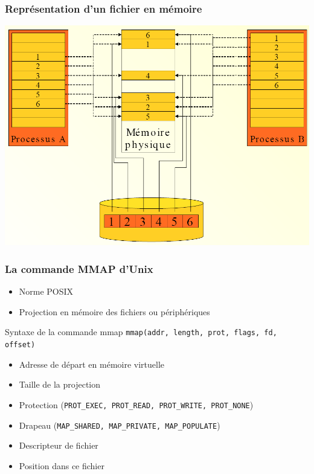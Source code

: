 \begin{frame}
\frametitle{Représentation d'un fichier en mémoire}
\includegraphics[width=.8\textwidth]{../illustration/repres_fichier_memoire.png}
\end{frame}

\begin{frame}
\frametitle{La commande MMAP d'Unix}
\begin{itemize}
  \item Norme POSIX
  \item Projection en mémoire des fichiers ou périphériques
\end{itemize}

\begin{exampleblock}{Syntaxe de la commande mmap}
    \texttt{mmap(addr, length, prot, flags, fd, offset)}

    \begin{itemize}
      \item Adresse de départ en mémoire virtuelle
      \item Taille de la projection
      \item Protection (\texttt{PROT\_EXEC, PROT\_READ, PROT\_WRITE, PROT\_NONE})
      \item Drapeau (\texttt{MAP\_SHARED, MAP\_PRIVATE, MAP\_POPULATE})
      \item Descripteur de fichier
      \item Position dans ce fichier
   \end{itemize}

\end{exampleblock}



\end{frame}


